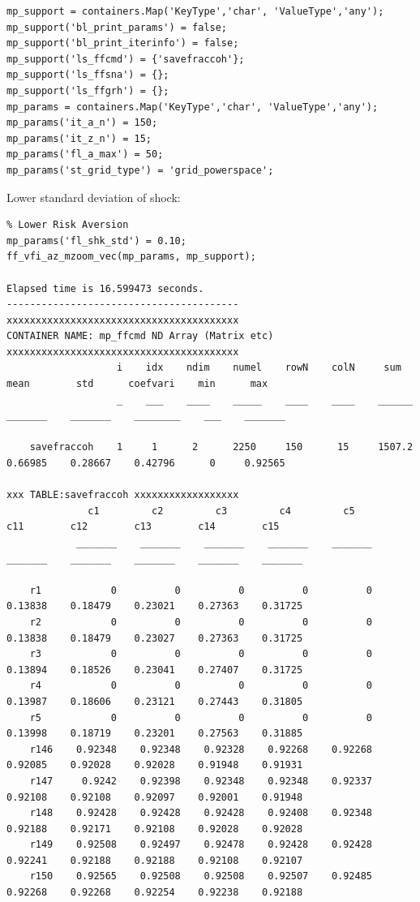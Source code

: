 \documentclass[
]{book}
\begin{document}
\begin{verbatim}
mp_support = containers.Map('KeyType','char', 'ValueType','any');
mp_support('bl_print_params') = false;
mp_support('bl_print_iterinfo') = false;
mp_support('ls_ffcmd') = {'savefraccoh'};
mp_support('ls_ffsna') = {};
mp_support('ls_ffgrh') = {};
mp_params = containers.Map('KeyType','char', 'ValueType','any');
mp_params('it_a_n') = 150;
mp_params('it_z_n') = 15;
mp_params('fl_a_max') = 50;
mp_params('st_grid_type') = 'grid_powerspace';
\end{verbatim}

Lower standard deviation of shock:

\begin{verbatim}
% Lower Risk Aversion
mp_params('fl_shk_std') = 0.10;
ff_vfi_az_mzoom_vec(mp_params, mp_support);

Elapsed time is 16.599473 seconds.
----------------------------------------
xxxxxxxxxxxxxxxxxxxxxxxxxxxxxxxxxxxxxxxx
CONTAINER NAME: mp_ffcmd ND Array (Matrix etc)
xxxxxxxxxxxxxxxxxxxxxxxxxxxxxxxxxxxxxxxx
                   i    idx    ndim    numel    rowN    colN     sum       mean        std      coefvari    min      max  
                   _    ___    ____    _____    ____    ____    ______    _______    _______    ________    ___    _______

    savefraccoh    1     1      2      2250     150      15     1507.2    0.66985    0.28667    0.42796      0     0.92565

xxx TABLE:savefraccoh xxxxxxxxxxxxxxxxxx
              c1         c2         c3         c4         c5         c11        c12        c13        c14        c15  
            _______    _______    _______    _______    _______    _______    _______    _______    _______    _______

    r1            0          0          0          0          0    0.13838    0.18479    0.23021    0.27363    0.31725
    r2            0          0          0          0          0    0.13838    0.18479    0.23027    0.27363    0.31725
    r3            0          0          0          0          0    0.13894    0.18526    0.23041    0.27407    0.31725
    r4            0          0          0          0          0    0.13987    0.18606    0.23121    0.27443    0.31805
    r5            0          0          0          0          0    0.13998    0.18719    0.23201    0.27563    0.31885
    r146    0.92348    0.92348    0.92328    0.92268    0.92268    0.92085    0.92028    0.92028    0.91948    0.91931
    r147     0.9242    0.92398    0.92348    0.92348    0.92337    0.92108    0.92108    0.92097    0.92001    0.91948
    r148    0.92428    0.92428    0.92428    0.92408    0.92348    0.92188    0.92171    0.92108    0.92028    0.92028
    r149    0.92508    0.92497    0.92478    0.92428    0.92428    0.92241    0.92188    0.92188    0.92108    0.92107
    r150    0.92565    0.92508    0.92508    0.92507    0.92485    0.92268    0.92268    0.92254    0.92238    0.92188
\end{verbatim}
\end{document}
